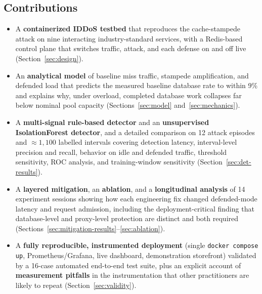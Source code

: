 \subsection{Contributions}
\begin{itemize}[leftmargin=*]
\item A \textbf{containerized IDDoS testbed} that reproduces the cache-stampede attack
on nine interacting industry-standard services, with a Redis-based control plane that
switches traffic, attack, and each defense on and off live
(Section~\ref{sec:design}).
\item An \textbf{analytical model} of baseline miss traffic, stampede amplification,
and defended load that predicts the measured baseline database rate to within 9\%
and explains why, under overload, completed database work collapses far below
nominal pool capacity (Sections~\ref{sec:model} and~\ref{sec:mechanics}).
\item A \textbf{multi-signal rule-based detector} and an \textbf{unsupervised
IsolationForest detector}, and a detailed comparison on 12 attack episodes and
${\approx}1{,}100$ labelled intervals covering detection latency, interval-level
precision and recall, behavior on idle and defended traffic, threshold sensitivity,
ROC analysis, and training-window sensitivity (Section~\ref{sec:det-results}).
\item A \textbf{layered mitigation}, an \textbf{ablation}, and a \textbf{longitudinal
analysis} of 14 experiment sessions showing how each engineering fix changed
defended-mode latency and request admission, including the deployment-critical
finding that database-level and proxy-level protection are distinct and both
required (Sections~\ref{sec:mitigation-results}--\ref{sec:ablation}).
\item A \textbf{fully reproducible, instrumented deployment} (single
\texttt{docker compose up}, Prometheus/Grafana, live dashboard, demonstration
storefront) validated by a 16-case automated end-to-end test suite, plus an explicit
account of \textbf{measurement pitfalls} in the instrumentation that other
practitioners are likely to repeat (Section~\ref{sec:validity}).
\end{itemize}

